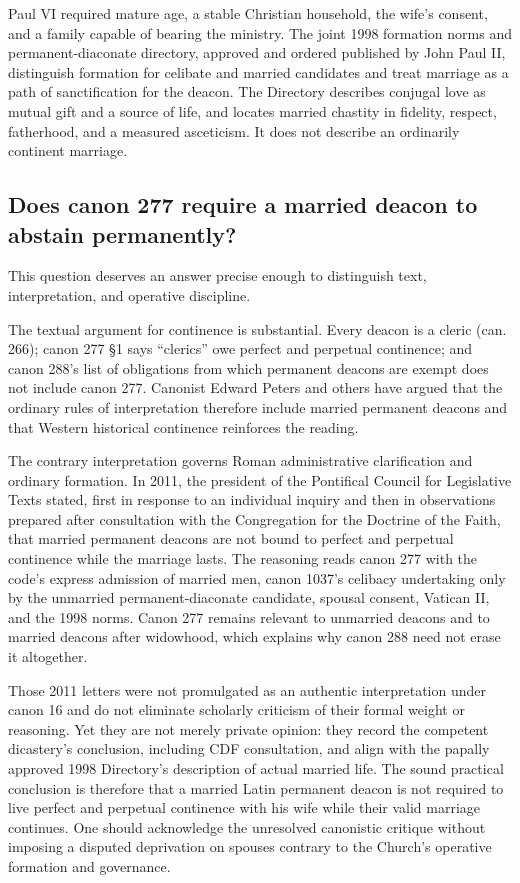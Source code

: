 Paul VI required mature age, a stable Christian household, the wife's consent, and a family capable of bearing the ministry. The joint 1998 formation norms and permanent-diaconate directory, approved and ordered published by John Paul II, distinguish formation for celibate and married candidates and treat marriage as a path of sanctification for the deacon. The Directory describes conjugal love as mutual gift and a source of life, and locates married chastity in fidelity, respect, fatherhood, and a measured asceticism. It does not describe an ordinarily continent marriage.

\subsection{Does canon 277 require a married deacon to abstain permanently?}

This question deserves an answer precise enough to distinguish text, interpretation, and operative discipline.

The textual argument for continence is substantial. Every deacon is a cleric (can. 266); canon 277 \S1 says ``clerics'' owe perfect and perpetual continence; and canon 288's list of obligations from which permanent deacons are exempt does not include canon 277. Canonist Edward Peters and others have argued that the ordinary rules of interpretation therefore include married permanent deacons and that Western historical continence reinforces the reading.

The contrary interpretation governs Roman administrative clarification and ordinary formation. In 2011, the president of the Pontifical Council for Legislative Texts stated, first in response to an individual inquiry and then in observations prepared after consultation with the Congregation for the Doctrine of the Faith, that married permanent deacons are not bound to perfect and perpetual continence while the marriage lasts. The reasoning reads canon 277 with the code's express admission of married men, canon 1037's celibacy undertaking only by the unmarried permanent-diaconate candidate, spousal consent, Vatican II, and the 1998 norms. Canon 277 remains relevant to unmarried deacons and to married deacons after widowhood, which explains why canon 288 need not erase it altogether.

Those 2011 letters were not promulgated as an authentic interpretation under canon 16 and do not eliminate scholarly criticism of their formal weight or reasoning. Yet they are not merely private opinion: they record the competent dicastery's conclusion, including CDF consultation, and align with the papally approved 1998 Directory's description of actual married life. The sound practical conclusion is therefore that a married Latin permanent deacon is not required to live perfect and perpetual continence with his wife while their valid marriage continues. One should acknowledge the unresolved canonistic critique without imposing a disputed deprivation on spouses contrary to the Church's operative formation and governance.

